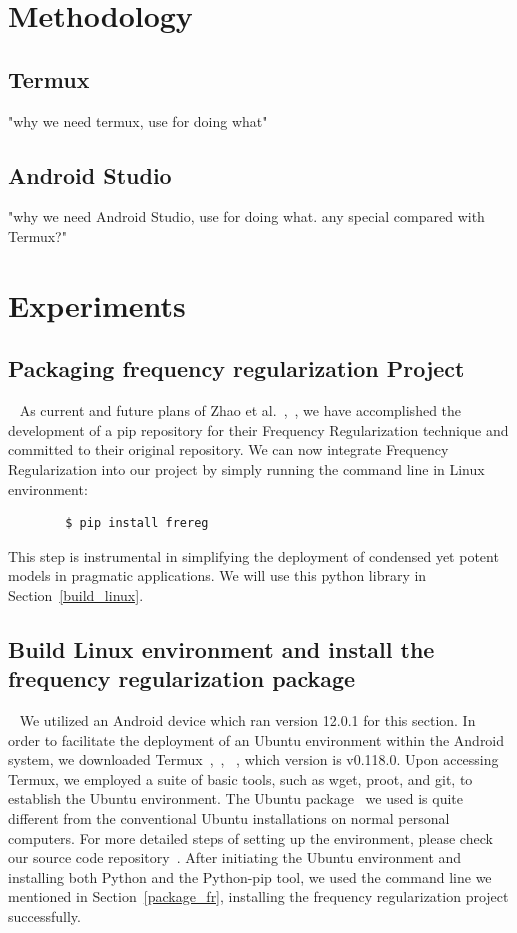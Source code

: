 \documentclass[conference]{IEEEtran}
\begin{document}
\section{Methodology} 
\subsection{Termux}
"why we need termux, use for doing what"

\subsection{Android Studio}
"why we need Android Studio, use for doing what. any special compared with Termux?"



\section{Experiments} 
\subsection{Packaging frequency regularization Project}~\label{package_fr}
As current and future plans of Zhao et al.~\cite{fr_repo},~\cite{zhao2023fr}, we have accomplished the development of a pip repository for their Frequency Regularization technique and committed to their original repository. We can now integrate Frequency Regularization into our project by simply running the command line in Linux environment:

	\begin{verbatim}
		$ pip install frereg
	\end{verbatim}

This step is instrumental in simplifying the deployment of condensed yet potent models in pragmatic applications. We will use this python library in Section~\ref{build_linux}.

\subsection{Build Linux environment and install the frequency regularization package} ~\label{build_linux}
We utilized an Android device which ran version 12.0.1 for this section. In order to facilitate the deployment of an Ubuntu environment within the Android system, we downloaded Termux~\cite{termux_repo},~\cite{termux_overview},~\cite{termux_wiki} , which version is v0.118.0. Upon accessing Termux, we employed a suite of basic tools, such as wget, proot, and git, to establish the Ubuntu environment. The Ubuntu package~\cite{ubuntu_in_termux_repo} we used is quite different from the conventional Ubuntu installations on normal personal computers. For more detailed steps of setting up the environment, please check our source code repository~\cite{nerual_on_mobile_repo}. After initiating the Ubuntu environment and installing both Python and the Python-pip tool, we used the command line we mentioned in Section~\ref{package_fr}, installing the frequency regularization project successfully.
\end{document}
